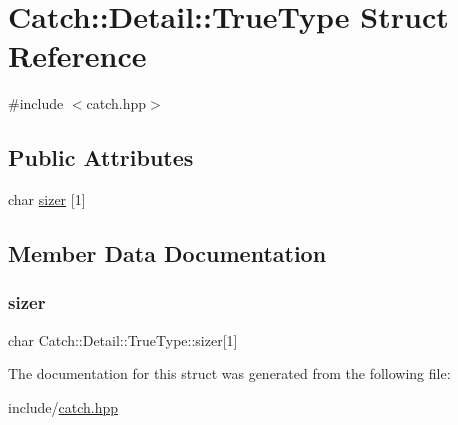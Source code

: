 \hypertarget{struct_catch_1_1_detail_1_1_true_type}{}\section{Catch\+:\+:Detail\+:\+:True\+Type Struct Reference}
\label{struct_catch_1_1_detail_1_1_true_type}


{\ttfamily \#include $<$catch.\+hpp$>$}

\subsection*{Public Attributes}
\begin{DoxyCompactItemize}
\item 
char \mbox{\hyperlink{struct_catch_1_1_detail_1_1_true_type_a3aaaeb75909e668b293c8a81f5fb6419}{sizer}} \mbox{[}1\mbox{]}
\end{DoxyCompactItemize}


\subsection{Member Data Documentation}
\mbox{\label{struct_catch_1_1_detail_1_1_true_type_a3aaaeb75909e668b293c8a81f5fb6419}} 
\subsubsection{\texorpdfstring{sizer}{sizer}}
{\footnotesize\ttfamily char Catch\+::\+Detail\+::\+True\+Type\+::sizer\mbox{[}1\mbox{]}}



The documentation for this struct was generated from the following file\+:\begin{DoxyCompactItemize}
\item 
include/\mbox{\hyperlink{catch_8hpp}{catch.\+hpp}}\end{DoxyCompactItemize}
